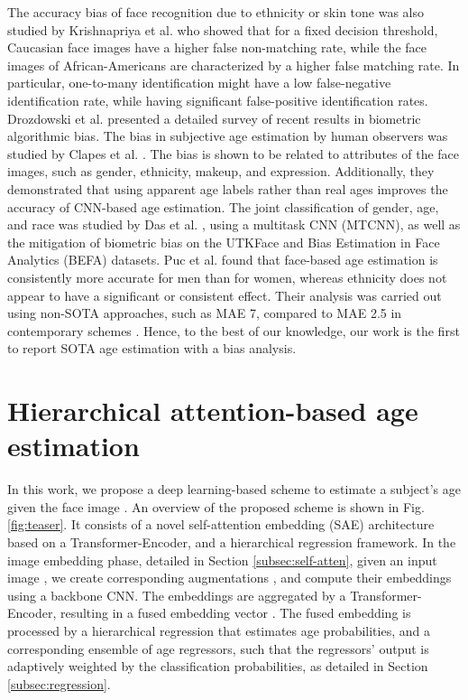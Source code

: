 \documentclass[10pt,journal]{IEEEtran}\usepackage{amsfonts}
\begin{document}
The accuracy bias of face recognition due to ethnicity or skin tone was also
studied by Krishnapriya et al. \cite{9001031} who showed that for a fixed
decision threshold, Caucasian face images have a higher false non-matching
rate, while the face images of African-Americans are characterized by a higher
false matching rate. In particular, one-to-many identification might have a
low false-negative identification rate, while having significant
false-positive identification rates. Drozdowski et al. \cite{9086771}
presented a detailed survey of recent results in biometric algorithmic bias.
The bias in subjective age estimation by human observers was studied by Clapes
et al. \cite{8575487}. The bias is shown to be related to attributes of the
face images, such as gender, ethnicity, makeup, and expression. Additionally,
they demonstrated that using apparent age labels rather than real ages
improves the accuracy of CNN-based age estimation. The joint classification of
gender, age, and race was studied by Das et al. \cite{Das_2018_ECCV_Workshops}, using a multitask CNN (MTCNN), as well as the mitigation of biometric bias
on the UTKFace and Bias Estimation in Face Analytics (BEFA) datasets. Puc et
al. \cite{9287219} found that face-based age estimation is consistently more
accurate for men than for women, whereas ethnicity does not appear to have a
significant or consistent effect. Their analysis was carried out using
non-SOTA approaches, such as MAE 7, compared to MAE 2.5 in
contemporary schemes \cite{1613043}. Hence, to the best of our knowledge, our
work is the first to report SOTA age estimation with a bias analysis.

\section{Hierarchical attention-based age estimation}

\label{sec:Proposed Method}

In this work, we propose a deep learning-based scheme to estimate a subject's
age  given the face image . An overview of the
proposed scheme is shown in Fig. \ref{fig:teaser}. It consists of a novel
self-attention embedding (SAE) architecture based on a Transformer-Encoder,
and a hierarchical regression framework. In the image embedding phase,
detailed in Section \ref{subsec:self-atten}, given an input image ,
we create  corresponding augmentations , and
compute their embeddings  using a backbone
CNN. The embeddings  are aggregated by a
Transformer-Encoder, resulting in a fused embedding vector .
The fused embedding is processed by a hierarchical regression that estimates
age probabilities, and a corresponding ensemble of age regressors, such that
the regressors' output is adaptively weighted by the classification
probabilities, as detailed in Section \ref{subsec:regression}.
\end{document}
